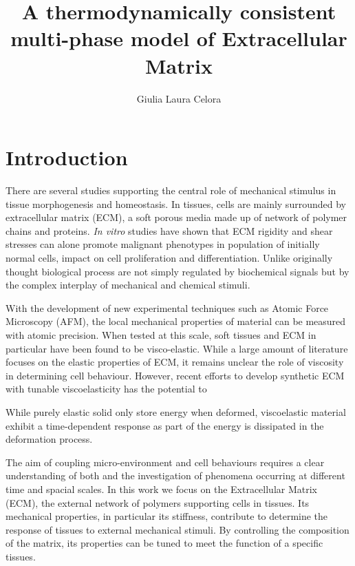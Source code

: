 \documentclass[runningheads]{llncs}
\begin{document}
%
\title{A thermodynamically consistent multi-phase model of Extracellular Matrix}
%
%
\author{Giulia Laura Celora}
%
%
%
\maketitle              %
%
\begin{abstract}

\end{abstract}
%
%
%
\section{Introduction}
There are several studies supporting the central role of mechanical stimulus in tissue morphogenesis and homeostasis. In tissues, cells are mainly surrounded by extracellular matrix (ECM), a soft porous media made up of  network of polymer chains and proteins. \textit{In vitro} studies have shown that ECM rigidity and shear stresses can alone promote malignant phenotypes in population of initially normal cells, impact on cell proliferation and differentiation. Unlike originally thought biological process are not simply regulated by biochemical signals but by the complex interplay of mechanical and chemical stimuli.

With the development of new experimental techniques such as Atomic Force Microscopy (AFM), the local mechanical properties of material can be measured with atomic precision. When tested at this scale, soft tissues and ECM in particular have been found to be visco-elastic. While a large amount of literature focuses on the elastic properties of ECM, it remains unclear the role of viscosity in determining cell behaviour. However, recent efforts to develop synthetic ECM with tunable viscoelasticity has the potential to 
 

 While purely elastic solid only store energy when deformed, viscoelastic material exhibit a time-dependent response as part of the energy is dissipated in the deformation process.



The aim of coupling micro-environment and cell behaviours requires a clear understanding of both and the investigation of phenomena occurring at different time and spacial scales. In this work we focus on the Extracellular Matrix (ECM), the external network of polymers supporting cells in tissues. Its mechanical properties, in particular its stiffness, contribute to determine the response of tissues to external mechanical stimuli. By controlling the composition of the matrix, its properties can be tuned to meet the function of a specific tissues. 
\end{document}
